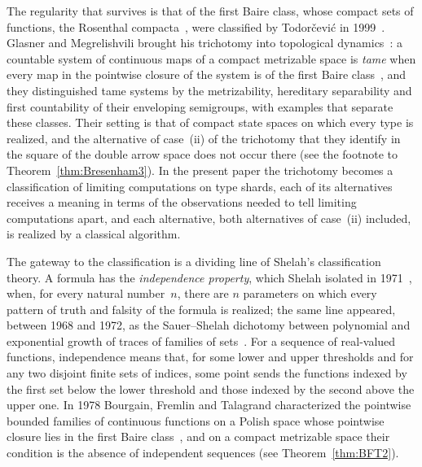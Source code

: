 \documentclass[psamsfonts]{amsart}
\theoremstyle{definition}
\theoremstyle{remark}
\numberwithin{equation}{section}
\begin{document}
The regularity that survives is that of the first Baire class, whose compact sets of functions, the Rosenthal compacta~\cite{Rosenthal:1977,Godefroy:1980}, were classified by Todorčević in 1999~\cite{Todorcevic_1999_CompactSubsetsBaire}.
Glasner and Megrelishvili brought his trichotomy into topological dynamics~\cite{glasner2022tame}: a countable system of continuous maps of a compact metrizable space is \emph{tame} when every map in the pointwise closure of the system is of the first Baire class~\cite{Kohler1995,Glasner2006}, and they distinguished tame systems by the metrizability, hereditary separability and first countability of their enveloping semigroups, with examples that separate these classes.
Their setting is that of compact state spaces on which every type is realized, and the alternative of case~(ii) of the trichotomy that they identify in the square of the double arrow space does not occur there (see the footnote to Theorem~\ref{thm:Bresenham3}).
In the present paper the trichotomy becomes a classification of limiting computations on type shards, each of its alternatives receives a meaning in terms of the observations needed to tell limiting computations apart, and each alternative, both alternatives of case~(ii) included, is realized by a classical algorithm.

The gateway to the classification is a dividing line of Shelah's classification theory.
A formula has the \emph{independence property}, which Shelah isolated in 1971~\cite[Definition~4.1]{Shelah:1971}, when, for every natural number~$n$, there are $n$ parameters on which every pattern of truth and falsity of the formula is realized; the same line appeared, between 1968 and 1972, as the Sauer--Shelah dichotomy between polynomial and exponential growth of traces of families of sets~\cite{Vapnik-Chervonenkis:1968,Vapnik-Chervonenkis:1971,Sauer:1972,Shelah:1972}.
For a sequence of real-valued functions, independence means that, for some lower and upper thresholds and for any two disjoint finite sets of indices, some point sends the functions indexed by the first set below the lower threshold and those indexed by the second above the upper one.
In 1978 Bourgain, Fremlin and Talagrand characterized the pointwise bounded families of continuous functions on a Polish space whose pointwise closure lies in the first Baire class~\cite{BFT_1978_PCompactBaire}, and on a compact metrizable space their condition is the absence of independent sequences (see Theorem~\ref{thm:BFT2}).
\end{document}
